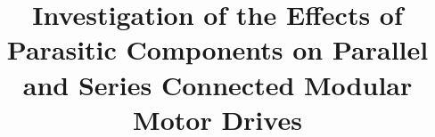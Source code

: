 \documentclass[pdftex,11pt,oneside,letter]{article}
\begin{document}
\title {\large  \bf \vspace{-8ex}
Investigation of the Effects of Parasitic Components on Parallel and Series Connected Modular Motor Drives
\vspace{-10ex}}
\date{}
\maketitle
\thispagestyle{empty}
\pagestyle{empty}

\renewcommand{\figurename}{Fig.}









{\vspace{\baselineskip}


}
\end{document}
